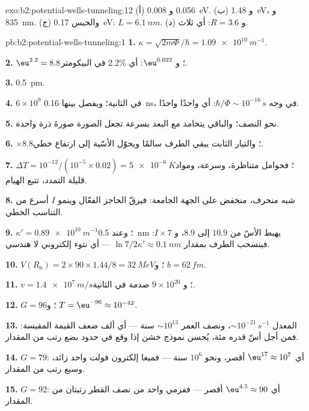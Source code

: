 \begin{solution}{exo:b2:potential-wells-tunneling:12}
(أ) \qty{0.056}{} و \qty{0.008}{eV}. (ب) و \qty{1.48}{eV}، و \qty{835}{nm}. (ج) والحبس
\qty{0.17}{eV}: $L = \qty{6.1}{nm}$. (د) و $R = 3.6$: أي ثلاث.
\end{solution}

\begin{solution}{pb:b2:potential-wells-tunneling:1}
\textbf{1.} $\kappa = \sqrt{2m\Phi}/\hbar = \qty{1.09e10}{m^{-1}}$.

\textbf{2.} $\eu^{2.2} = 8.8$؛ و $\eu^{0.022}$: أي $2.2\%$ في البيكومتر.

\textbf{3.} \qty{0.5}{pm}.

\textbf{4.} $6 \times 10^9$ في الثانية؛ ويفصل بينها \qty{0.16}{ns}، في وجه $\hbar/\Phi
\sim 10^{-16}\,\unit{s}$: أي واحدًا واحدًا.

\textbf{5.} نحو النصف؛ والباقي يتخامد مع البعد بسرعة تجعل
الصورة صورةَ ذرة واحدة.

\textbf{6.} $\times 8.8$؛ والتيار الثابت يبقي الطرف سالمًا ويحوّل
الأسّية إلى ارتفاع خطي.

\textbf{7.} $\Delta T = 10^{-12}/(10^{-5} \times 0.02) = \qty{5e-6}{K}$؛ فحوامل
متناظرة، وسرعة، ومواد قليلة التمدد،  تتبع
الهيام.

\textbf{8.} شبه منحرف، منخفض على الجهة الجامعة: فيرقّ الحاجز
الفعّال وينمو $I$ أسرع من التناسب الخطي.

\textbf{9.} $\kappa' = \qty{0.89e10}{m^{-1}}$؛ وعند \qty{0.5}{nm} يهبط الأسّ من
$10.9$ إلى $8.9$، و $I \times 7$: فينسحب الطرف بمقدار $\ln 7/2\kappa' \approx \qty{0.1}{nm}$
--- أي نتوء إلكتروني لا هندسي.

\textbf{10.} $V(R_{\text{n}}) = 2 \times 90 \times 1.44/8 = \qty{32}{MeV}$؛ و $b = \qty{62}{fm}$.

\textbf{11.} $v = \qty{1.4e7}{m/s}$؛ و $9 \times 10^{20}$ صدمة في الثانية.

\textbf{12.} $G = 96$؛ و $T = \eu^{-96} \approx 10^{-42}$.

\textbf{13.} المعدل $\sim 10^{-21}\,\unit{s^{-1}}$، ونصف العمر $\sim 10^{13}$ سنة --- أي
ألف ضعف القيمة المقيسة: فمن أجل أسّ قدره مئة، يُحسن
نموذج خشن إذا وقع في حدود بضع رتب من المقدار.

\textbf{14.} $G = 79$: أي $\eu^{17} \approx 10^7$ أقصر، ونحو $10^6$ سنة ---
فميغا إلكترون فولت واحد زائد، وسبع رتب من المقدار.

\textbf{15.} $G = 92$: أي $\eu^{4.5} \approx 90$ أقصر --- ففرمي واحد من نصف القطر
رتبتان من المقدار.


\end{solution}
